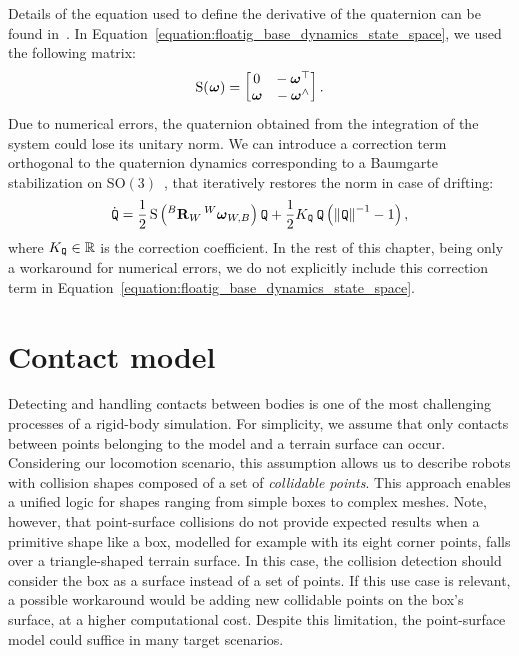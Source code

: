 \begin{remark*}
%
Details of the equation used to define the derivative of the quaternion can be found in~\cite{sola_quaternion_2017}.
In Equation~\eqref{equation:floatig_base_dynamics_state_space}, we used the following matrix:
%
\begin{equation*}
    \operatorname{S}(\prescript{}{}{\boldsymbol{\omega}}) =
    \begin{bmatrix}
        0 & -\prescript{}{}{\boldsymbol{\omega}}^\top \\ \prescript{}{}{\boldsymbol{\omega}} & -\prescript{}{}{\boldsymbol{\omega}}^\wedge
    \end{bmatrix}
    .
\end{equation*}
%
Due to numerical errors, the quaternion obtained from the integration of the system could lose its unitary norm.
We can introduce a correction term orthogonal to the quaternion dynamics corresponding to a Baumgarte stabilization on SO$(3)$~\citep{gros_baumgarte_2015}, that iteratively restores the norm in case of drifting:
%
\begin{equation*}
    \dot\quat = \frac{1}{2} \operatorname{S}\left( \rot[B]_W \velang[W]_{W,B} \right) \quat + \frac{1}{2} K_{\quat} \quat \left( \norm{\quat}^{-1} - 1 \right)
    ,
\end{equation*}
%
where $K_{\prescript{}{}{\mathtt{Q}}} \in \mathbb{R}$ is the correction coefficient.
In the rest of this chapter, being only a workaround for numerical errors, we do not explicitly include this correction term in Equation~\eqref{equation:floatig_base_dynamics_state_space}.
%
\end{remark*}

\section{Contact model}
\label{section:contact_model}

Detecting and handling contacts between bodies is one of the most challenging processes of a rigid-body simulation.
For simplicity, we assume that only contacts between points belonging to the model and a terrain surface can occur.
Considering our locomotion scenario, this assumption allows us to describe robots with collision shapes composed of a set of \emph{collidable points}.
This approach enables a unified logic for shapes ranging from simple boxes to complex meshes.
Note, however, that point-surface collisions do not provide expected results when a primitive shape like a box, modelled for example with its eight corner points, falls over a triangle-shaped terrain surface.
In this case, the collision detection should consider the box as a surface instead of a set of points.
If this use case is relevant, a possible workaround would be adding new collidable points on the box's surface, at a higher computational cost.
Despite this limitation, the point-surface model could suffice in many target scenarios.

